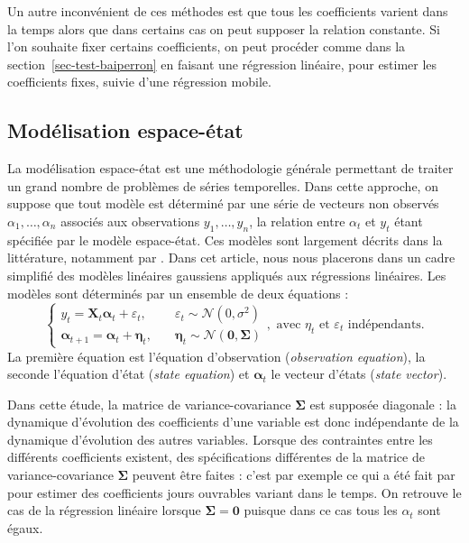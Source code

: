 \documentclass[
  a4paper,
  DIV=11,
  numbers=noendperiod,
  french]{scrartcl}
\newcommand\1{{\mathds 1}}
\newcommand{\bf}[1]{{\boldsymbol #1}}
\theoremstyle{remark}
\begin{document}
Un autre inconvénient de ces méthodes est que tous les coefficients
varient dans la temps alors que dans certains cas on peut supposer la
relation constante. Si l'on souhaite fixer certains coefficients, on
peut procéder comme dans la section~\ref{sec-test-baiperron} en faisant
une régression linéaire, pour estimer les coefficients fixes, suivie
d'une régression mobile.

\subsection{Modélisation espace-état}\label{sec-ssm}

La modélisation espace-état est une méthodologie générale permettant de
traiter un grand nombre de problèmes de séries temporelles. Dans cette
approche, on suppose que tout modèle est déterminé par une série de
vecteurs non observés \(\alpha_1,\dots,\alpha_n\) associés aux
observations \(y_1,\dots,y_n\), la relation entre \(\alpha_t\) et
\(y_t\) étant spécifiée par le modèle espace-état. Ces modèles sont
largement décrits dans la littérature, notamment par
\textcite{durbinkoopman}. Dans cet article, nous nous placerons dans un
cadre simplifié des modèles linéaires gaussiens appliqués aux
régressions linéaires. Les modèles sont déterminés par un ensemble de
deux équations : \[
\begin{cases}
y_t={\bf X_t}\bf\alpha_t+\varepsilon_t,\quad&\varepsilon_t\sim\mathcal N(0,\sigma^2)\\
\bf\alpha_{t+1}=\bf\alpha_t+\bf\eta_t,\quad&\bf\eta_t\sim\mathcal N(\bf 0,\bf\Sigma)
\end{cases},\text{ avec }\eta_t\text{ et }\varepsilon_t\text{ indépendants.}
\] La première équation est l'équation d'observation (\emph{observation
equation}), la seconde l'équation d'état (\emph{state equation}) et
\(\bf\alpha_t\) le vecteur d'états (\emph{state vector}).

Dans cette étude, la matrice de variance-covariance \(\bf\Sigma\) est
supposée diagonale : la dynamique d'évolution des coefficients d'une
variable est donc indépendante de la dynamique d'évolution des autres
variables. Lorsque des contraintes entre les différents coefficients
existent, des spécifications différentes de la matrice de
variance-covariance \(\bf\Sigma\) peuvent être faites : c'est par
exemple ce qui a été fait par \textcite{abs2006} pour estimer des
coefficients jours ouvrables variant dans le temps. On retrouve le cas
de la régression linéaire lorsque \(\bf\Sigma=\bf 0\) puisque dans ce
cas tous les \(\alpha_t\) sont égaux.
\end{document}
